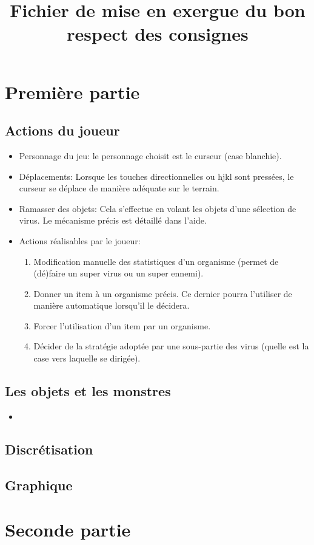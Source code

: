 \documentclass[a4paper,french]{article}
\title{Fichier de mise en exergue du bon respect des consignes}
\author{}
\date{}
\begin{document}
\maketitle

\section{Première partie}
\subsection{Actions du joueur}
\begin{itemize}
\item
Personnage du jeu:
le personnage choisit est le curseur (case blanchie).

\item
Déplacements:
Lorsque les touches directionnelles ou hjkl sont pressées, le curseur se
déplace de manière adéquate sur le terrain.

\item
Ramasser des objets:
Cela s'effectue en volant les objets d'une sélection de virus. Le mécanisme
précis est détaillé dans l'aide.

\item
Actions réalisables par le joueur:
\begin{enumerate}
	\item
	Modification manuelle des statistiques d'un organisme (permet de (dé)faire
	un super virus ou un super ennemi).

	\item
	Donner un item à un organisme précis. Ce dernier pourra l'utiliser de
	manière automatique lorsqu'il le décidera.

	\item
	Forcer l'utilisation d'un item par un organisme.

	\item
	Décider de la stratégie adoptée par une sous-partie des virus (quelle est la
	case vers laquelle se dirigée).
\end{enumerate}
\end{itemize}





\subsection{Les objets et les monstres}
\begin{itemize}
\item

\end{itemize}






\subsection{Discrétisation}
\subsection{Graphique}



\section{Seconde partie}
\end{document}
